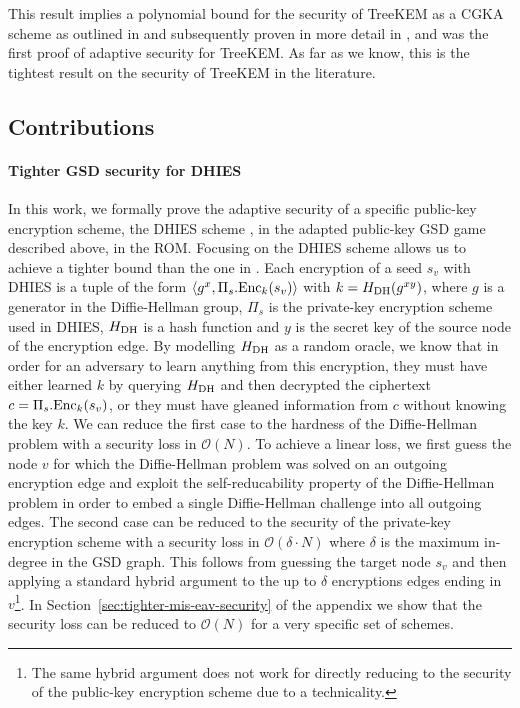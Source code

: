 This result implies a polynomial bound for the security of TreeKEM as a CGKA scheme as outlined in \cite[Theorem 4]{ttkem} and subsequently proven in more detail in \cite[Theorem 12]{modular-group-messaging}, and was the first proof of adaptive security for TreeKEM. As far as we know, this is the tightest result on the security of TreeKEM in the literature.

\subsection{Contributions}

\paragraph{Tighter GSD security for DHIES} In this work, we formally prove the adaptive security of a specific public-key encryption scheme, the DHIES  scheme \cite{dhies}, in the adapted public-key GSD game described above, in the ROM. Focusing on the DHIES scheme allows us to achieve a tighter bound than the one in \cite{ttkem}. Each encryption of a seed $s_v$ with DHIES is a tuple of the form $\langle g^{x}, \Pi_s.\mathrm{Enc}_{k}(s_v) \rangle$ with $k = H_\mathrm{DH}(g^{x y})$, where $g$ is a generator in the Diffie-Hellman group, $\Pi_s$ is the private-key encryption scheme used in DHIES, $H_\mathrm{DH}$ is a hash function and $y$ is the secret key of the source node of the encryption edge. By modelling $H_\mathrm{DH}$ as a random oracle, we know that in order for an adversary to learn anything from this encryption, they must have either learned $k$ by querying $H_\mathrm{DH}$ and then decrypted the ciphertext $c = \Pi_s.\mathrm{Enc}_{k}(s_v)$, or they must have gleaned information from $c$ without knowing the key $k$. We can reduce the first case to the hardness of the Diffie-Hellman problem with a security loss in $\mathcal{O}(N)$. To achieve a linear loss, we first guess the node $v$ for which the Diffie-Hellman problem was solved on an outgoing encryption edge and exploit the self-reducability property of the Diffie-Hellman problem in order to embed a single Diffie-Hellman challenge into all outgoing edges. The second case can be reduced to the security of the private-key encryption scheme with a security loss in $\mathcal{O}(\delta \cdot N)$ where $\delta$ is the maximum in-degree in the GSD graph.
This follows from guessing the target node $s_v$ and then applying a standard hybrid argument to the up to $\delta$ encryptions edges ending in $v$\footnote{The same hybrid argument does not work for directly reducing to the security of the public-key encryption scheme due to a technicality.}. In Section~\ref{sec:tighter-mis-eav-security} of the appendix we show that the security loss can be reduced to $\mathcal{O}(N)$ for a very specific set of schemes.

